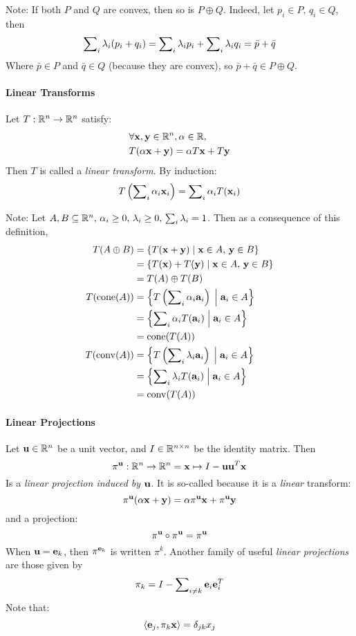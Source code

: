 Note:  If both $P$ and $Q$ are convex, then so is $P \oplus Q$.  Indeed, let $p_i \in P,\, q_i \in Q$, then
  \[\sum_i\nolimits \lambda_i(p_i + q_i) = 
  \sum\nolimits_{i} \lambda_{i} p_{i} + \sum\nolimits_{i} \lambda_{i} q_{i} = 
  \bar{p} + \bar{q}
  \]
Where $\bar{p} \in P$ and $\bar{q} \in Q$ (because they are convex), so $\bar{p} + \bar{q} \in P \oplus Q$.

\paragraph{Linear Transforms}
Let $T : \mathbb{R}^n \to \mathbb{R}^n$ satisfy:
\begin{align*}  
  &\forall \mathbf{x},\mathbf{y} \in \mathbb{R}^n, \alpha \in \mathbb{R}, \\
  &T(\alpha \mathbf{x} + \mathbf{y}) = \alpha T\mathbf{x} + T\mathbf{y} 
\end{align*}
Then $T$ is called a \textit{linear transform}.  By induction:
\[ T \left(\sum\nolimits_i \alpha_i \mathbf{x}_i\right) = 
           \sum\nolimits_i \alpha_i T(\mathbf{x}_i) \]

Note: Let $A, B \subseteq \mathbb{R}^n,\, \alpha_i \geq 0,\, \lambda_i \geq 0,\, \sum_i \lambda_i = 1$.  Then as a consequence of this definition,
\begin{align*} 
  T(A \oplus B) &= \{T(\mathbf{x} + \mathbf{y}) \;|\; \mathbf{x} \in A,\,\mathbf{y} \in B\} \\
                &= \{T(\mathbf{x}) + T(\mathbf{y}) \;|\; \mathbf{x} \in A,\,\mathbf{y} \in B\} \\
                &= T(A) \oplus T(B) \\
  T(\operatorname{cone}(A)) &= \left\{T\left(\sum\nolimits_i \alpha_i \mathbf{a}_i\right) 
                        \;\Big|\; \mathbf{a}_i \in A\right\} \\
              &= \left\{\sum\nolimits_i \alpha_i T(\mathbf{a}_i) 
                        \;\Big|\; \mathbf{a}_i \in A\right\} \\
              &= \operatorname{cone}(T(A)) \\
  T(\operatorname{conv}(A)) &= \left\{T\left(\sum\nolimits_i \lambda_i \mathbf{a}_i\right) 
                        \;\Big|\; \mathbf{a}_i \in A\right\} \\
              &= \left\{\sum\nolimits_i \lambda_i T(\mathbf{a}_i) 
                        \;\Big|\; \mathbf{a}_i \in A\right\} \\
              &= \operatorname{conv}(T(A))
\end{align*}

\paragraph{Linear Projections}
Let $\mathbf{u} \in \mathbb{R}^n$ be a unit vector, and $I \in \mathbb{R}^{n\times n}$ be the identity matrix.  Then
  \[ \pi^{\mathbf{u}} : \mathbb{R}^n \to \mathbb{R}^n = \mathbf{x} \mapsto I - \mathbf{u} \mathbf{u}^T\mathbf{x} \]
Is a \textit{linear projection induced by $\mathbf{u}$}.  It is so-called because it is a \textit{linear} transform: 
\[\pi^{\mathbf{u}}(\alpha \mathbf{x} + \mathbf{y}) = \alpha\pi^{\mathbf{u}}\mathbf{x} + \pi^{\mathbf{u}}\mathbf{y}\]
and a projection:
\[ \pi^{\mathbf{u}} \circ \pi^{\mathbf{u}} = \pi^{\mathbf{u}} \]
When $\mathbf{u} = \mathbf{e}_k$, then $\pi^{\mathbf{e}_k}$ is written $\pi^k$.  Another family of useful \textit{linear projections} are those given by
\[ \pi_k = I - \sum\nolimits_{i \neq k} \mathbf{e}_i\mathbf{e}_i^T \]
Note that: 
\[ \langle \mathbf{e}_j, \pi_k \mathbf{x} \rangle = \delta_{jk} x_j \]

